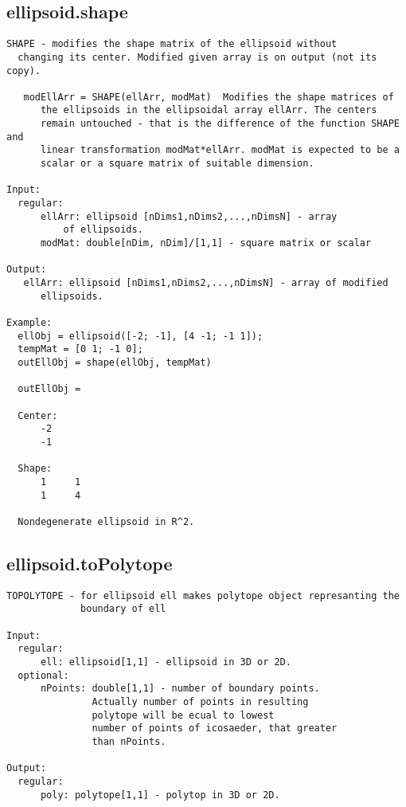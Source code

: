 \subsection{\texorpdfstring{ellipsoid.shape}{shape}}\label{method:ellipsoid.shape}
\begin{verbatim}
SHAPE - modifies the shape matrix of the ellipsoid without
  changing its center. Modified given array is on output (not its copy).

   modEllArr = SHAPE(ellArr, modMat)  Modifies the shape matrices of
      the ellipsoids in the ellipsoidal array ellArr. The centers
      remain untouched - that is the difference of the function SHAPE and
      linear transformation modMat*ellArr. modMat is expected to be a
      scalar or a square matrix of suitable dimension.

Input:
  regular:
      ellArr: ellipsoid [nDims1,nDims2,...,nDimsN] - array
          of ellipsoids.
      modMat: double[nDim, nDim]/[1,1] - square matrix or scalar

Output:
   ellArr: ellipsoid [nDims1,nDims2,...,nDimsN] - array of modified
      ellipsoids.

Example:
  ellObj = ellipsoid([-2; -1], [4 -1; -1 1]);
  tempMat = [0 1; -1 0];
  outEllObj = shape(ellObj, tempMat)

  outEllObj =

  Center:
      -2
      -1

  Shape:
      1     1
      1     4

  Nondegenerate ellipsoid in R^2.
\end{verbatim}
\subsection{\texorpdfstring{ellipsoid.toPolytope}{toPolytope}}\label{method:ellipsoid.toPolytope}
\begin{verbatim}
TOPOLYTOPE - for ellipsoid ell makes polytope object represanting the
             boundary of ell

Input:
  regular:
      ell: ellipsoid[1,1] - ellipsoid in 3D or 2D.
  optional:
      nPoints: double[1,1] - number of boundary points.
               Actually number of points in resulting
               polytope will be ecual to lowest
               number of points of icosaeder, that greater
               than nPoints.

Output:
  regular:
      poly: polytope[1,1] - polytop in 3D or 2D.
\end{verbatim}
